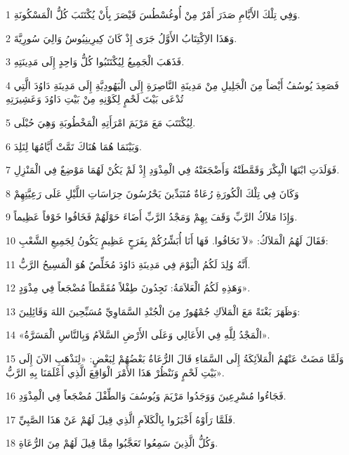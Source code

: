 \par 1 وَفِي تِلْكَ الأَيَّامِ صَدَرَ أَمْرٌ مِنْ أُوغُسْطُسَ قَيْصَرَ بِأَنْ يُكْتَتَبَ كُلُّ الْمَسْكُونَةِ.
\par 2 وَهَذَا الاِكْتِتَابُ الأَوَّلُ جَرَى إِذْ كَانَ كِيرِينِيُوسُ وَالِيَ سُورِيَّةَ.
\par 3 فَذَهَبَ الْجَمِيعُ لِيُكْتَتَبُوا كُلُّ وَاحِدٍ إِلَى مَدِينَتِهِ.
\par 4 فَصَعِدَ يُوسُفُ أَيْضاً مِنَ الْجَلِيلِ مِنْ مَدِينَةِ النَّاصِرَةِ إِلَى الْيَهُودِيَّةِ إِلَى مَدِينَةِ دَاوُدَ الَّتِي تُدْعَى بَيْتَ لَحْمٍ لِكَوْنِهِ مِنْ بَيْتِ دَاوُدَ وَعَشِيرَتِهِ
\par 5 لِيُكْتَتَبَ مَعَ مَرْيَمَ امْرَأَتِهِ الْمَخْطُوبَةِ وَهِيَ حُبْلَى.
\par 6 وَبَيْنَمَا هُمَا هُنَاكَ تَمَّتْ أَيَّامُهَا لِتَلِدَ.
\par 7 فَوَلَدَتِ ابْنَهَا الْبِكْرَ وَقَمَّطَتْهُ وَأَضْجَعَتْهُ فِي الْمِذْوَدِ إِذْ لَمْ يَكُنْ لَهُمَا مَوْضِعٌ فِي الْمَنْزِلِ.
\par 8 وَكَانَ فِي تِلْكَ الْكُورَةِ رُعَاةٌ مُتَبَدِّينَ يَحْرُسُونَ حِرَاسَاتِ اللَّيْلِ عَلَى رَعِيَّتِهِمْ
\par 9 وَإِذَا مَلاَكُ الرَّبِّ وَقَفَ بِهِمْ وَمَجْدُ الرَّبِّ أَضَاءَ حَوْلَهُمْ فَخَافُوا خَوْفاً عَظِيماً.
\par 10 فَقَالَ لَهُمُ الْمَلاَكُ: «لاَ تَخَافُوا. فَهَا أَنَا أُبَشِّرُكُمْ بِفَرَحٍ عَظِيمٍ يَكُونُ لِجَمِيعِ الشَّعْبِ:
\par 11 أَنَّهُ وُلِدَ لَكُمُ الْيَوْمَ فِي مَدِينَةِ دَاوُدَ مُخَلِّصٌ هُوَ الْمَسِيحُ الرَّبُّ.
\par 12 وَهَذِهِ لَكُمُ الْعَلاَمَةُ: تَجِدُونَ طِفْلاً مُقَمَّطاً مُضْجَعاً فِي مِذْوَدٍ».
\par 13 وَظَهَرَ بَغْتَةً مَعَ الْمَلاَكِ جُمْهُورٌ مِنَ الْجُنْدِ السَّمَاوِيِّ مُسَبِّحِينَ اللهَ وَقَائِلِينَ:
\par 14 «الْمَجْدُ لِلَّهِ فِي الأَعَالِي وَعَلَى الأَرْضِ السَّلاَمُ وَبِالنَّاسِ الْمَسَرَّةُ».
\par 15 وَلَمَّا مَضَتْ عَنْهُمُ الْمَلاَئِكَةُ إِلَى السَّمَاءِ قَالَ الرُّعَاةُ بَعْضُهُمْ لِبَعْضٍ: «لِنَذْهَبِ الآنَ إِلَى بَيْتِ لَحْمٍ وَنَنْظُرْ هَذَا الأَمْرَ الْوَاقِعَ الَّذِي أَعْلَمَنَا بِهِ الرَّبُّ».
\par 16 فَجَاءُوا مُسْرِعِينَ وَوَجَدُوا مَرْيَمَ وَيُوسُفَ وَالطِّفْلَ مُضْجَعاً فِي الْمِذْوَدِ.
\par 17 فَلَمَّا رَأَوْهُ أَخْبَرُوا بِالْكَلاَمِ الَّذِي قِيلَ لَهُمْ عَنْ هَذَا الصَّبِيِّ.
\par 18 وَكُلُّ الَّذِينَ سَمِعُوا تَعَجَّبُوا مِمَّا قِيلَ لَهُمْ مِنَ الرُّعَاةِ.
